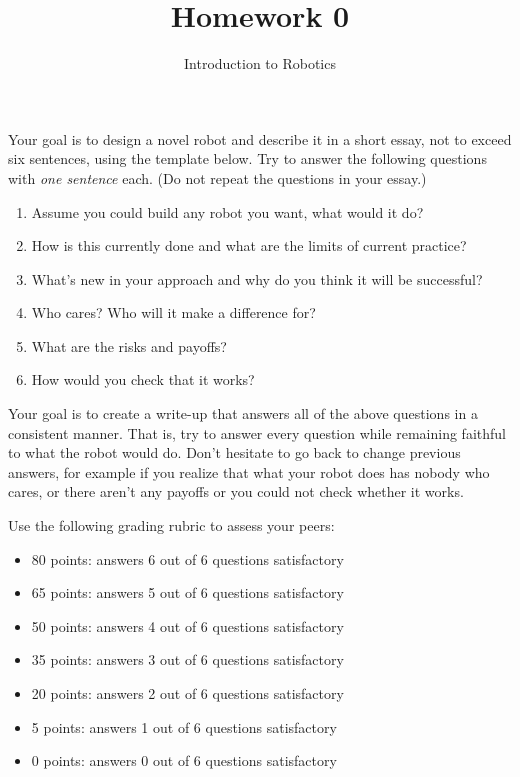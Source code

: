 \documentclass[letter,twoside,11pt]{article}
\begin{document}
\title{Homework 0}
\author{Introduction to Robotics}
\date{} %
\maketitle

Your goal is to design a novel robot and describe it in a short essay, not to exceed six sentences, using the template below. Try to answer the following questions with \emph{one sentence} each. (Do not repeat the questions in your essay.)

\begin{enumerate}
\item Assume you could build any robot you want, what would it do?
\item How is this currently done and what are the limits of current practice?
\item What's new in your approach and why do you think it will be successful?
\item Who cares? Who will it make a difference for?
\item What are the risks and payoffs?
\item How would you check that it works?
\end{enumerate}

Your goal is to create a write-up that answers all of the above questions in a consistent manner. That is, try to answer every question while remaining faithful to what the robot would do. Don't hesitate to go back to change previous answers, for example if you realize that what your robot does has nobody who cares, or there aren't any payoffs or you could not check whether it works.

Use the following grading rubric to assess your peers:

\begin{itemize}
\item 80 points: answers 6 out of 6 questions satisfactory
\item 65 points: answers 5 out of 6 questions satisfactory
\item 50 points: answers 4 out of 6 questions satisfactory
\item 35 points: answers 3 out of 6 questions satisfactory
\item 20 points: answers 2 out of 6 questions satisfactory
\item 5 points: answers 1 out of 6 questions satisfactory
\item 0 points: answers 0 out of 6 questions satisfactory
\end{itemize}
\end{document}
